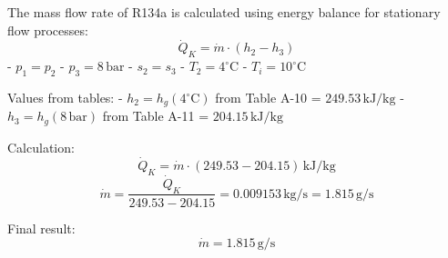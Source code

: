 The mass flow rate of R134a is calculated using energy balance for stationary flow processes:  
\[
\dot{Q}_K = \dot{m} \cdot (h_2 - h_3)
\]  
- \( p_1 = p_2 \)  
- \( p_3 = 8 \, \text{bar} \)  
- \( s_2 = s_3 \)  
- \( T_2 = 4^\circ \text{C} \)  
- \( T_i = 10^\circ \text{C} \)  

Values from tables:  
- \( h_2 = h_g(4^\circ \text{C}) \) from Table A-10 = \( 249.53 \, \text{kJ/kg} \)  
- \( h_3 = h_g(8 \, \text{bar}) \) from Table A-11 = \( 204.15 \, \text{kJ/kg} \)  

Calculation:  
\[
\dot{Q}_K = \dot{m} \cdot (249.53 - 204.15) \, \text{kJ/kg}
\]  
\[
\dot{m} = \frac{\dot{Q}_K}{249.53 - 204.15} = 0.009153 \, \text{kg/s} = 1.815 \, \text{g/s}
\]  

Final result:  
\[
\dot{m} = 1.815 \, \text{g/s}
\]